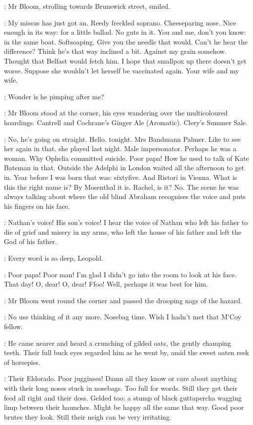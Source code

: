 :
Mr Bloom, strolling towards Brunswick street, smiled.

\BloomInt:
My missus has just got an.
Reedy freckled soprano.
Cheeseparing nose.
Nice enough in its way: for a little ballad.
No guts in it.
You and me, don't you know:
in the same boat.
Softsoaping.
Give you the needle that would.
Can't he hear the difference?
Think he's that way inclined a bit.
Against my grain somehow.
Thought that Belfast would fetch him.
I hope that smallpox up there doesn't get worse.
Suppose she wouldn't let herself be vaccinated again.
Your wife and my wife.

\BloomInt:
Wonder is he pimping after me?

:
Mr Bloom stood at the corner,
his eyes wandering over the multicoloured hoardings.
Cantrell and Cochrane's Ginger Ale (Aromatic).
Clery's Summer Sale.

\BloomInt:
No, he's going on straight.
Hello.
 tonight.
Mrs Bandmann Palmer.
Like to see her again in that.
 she played last night.
Male impersonator.
Perhaps he was a woman.
Why Ophelia committed suicide.
Poor papa!
How he used to talk of Kate Bateman in that.
Outside the Adelphi in London
waited all the afternoon to get in.
Year before I was born
that was:
sixtyfive.
And Ristori in Vienna.
What is this the right name is?
By Mosenthal it is.
Rachel, is it?
No.
The scene he was always talking about
where the old blind Abraham recognises the voice
and puts his fingers on his face.

\BloomInt:
Nathan's voice!
His son's voice!
I hear the voice of Nathan who left his father
to die of grief and misery in my arms,
who left the house of his father
and left the God of his father.

\BloomInt:
Every word is so deep, Leopold.

\BloomInt:
Poor papa!
Poor man!
I'm glad I didn't go into the room to look at his face.
That day!
O, dear!
O, dear!
Ffoo!
Well, perhaps it was best for him.

:
Mr Bloom went round the corner
and passed the drooping nags of the hazard.

\BloomInt:
No use thinking of it any more.
Nosebag time.
Wish I hadn't met that M'Coy fellow.

:
He came nearer and heard a crunching of gilded oats,
the gently champing teeth.
Their full buck eyes regarded him as he went by,
amid the sweet oaten reek of horsepiss.

\BloomInt:
Their Eldorado.
Poor jugginses!
Damn all they know or care about anything
with their long noses stuck in nosebags.
Too full for words.
Still they get their feed all right and their doss.
Gelded too:
a stump of black guttapercha wagging limp between their haunches.
Might be happy all the same that way.
Good poor brutes they look.
Still their neigh can be very irritating.

